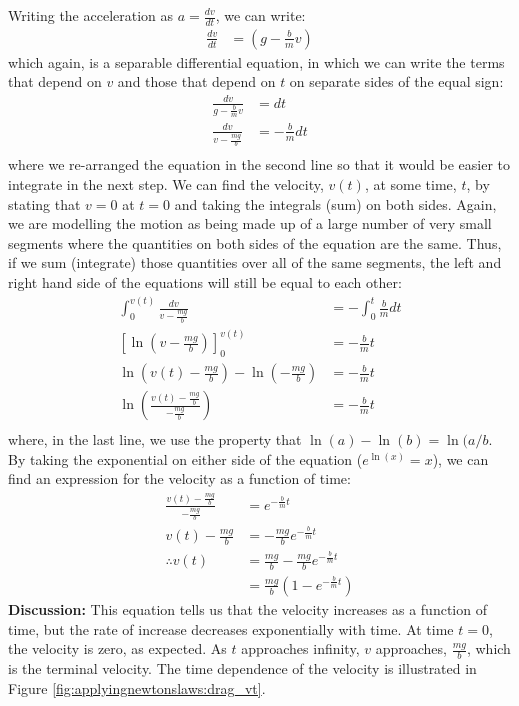 \begin{example}
Writing the acceleration as $a=\frac{dv}{dt}$, we can write:
\begin{align*}
\frac{dv}{dt} &= \left(g-\frac{b}{m}v \right)
\end{align*}
which again, is a separable differential equation, in which we can write the terms that depend on $v$ and those that depend on $t$ on separate sides of the equal sign:
\begin{align*}
\frac{dv}{g-\frac{b}{m}v}&= dt\\
\frac{dv}{v-\frac{mg}{b}}&= -\frac{b}{m}dt\\
\end{align*}
where we re-arranged the equation in the second line so that it would be easier to integrate in the next step. We can find the velocity, $v(t)$, at some time, $t$, by stating that $v=0$ at $t=0$ and taking the integrals (sum) on both sides. Again, we are modelling the motion as being made up of a large number of very small segments where the quantities on both sides of the equation are the same. Thus, if we sum (integrate) those quantities over all of the same segments, the left and right hand side of the equations will still be equal to each other:
\begin{align*}
\int_0^{v(t)}\frac{dv}{v-\frac{mg}{b}} &= -\int_0^t\frac{b}{m} dt\\
\left[\ln\left(v-\frac{mg}{b} \right)\right]_0^{v(t)} &=-\frac{b}{m}t\\
\ln\left(v(t)-\frac{mg}{b} \right)-\ln\left(-\frac{mg}{b} \right)&=-\frac{b}{m}t\\
\ln\left( \frac{v(t)-\frac{mg}{b}}{-\frac{mg}{b}} \right)&=-\frac{b}{m}t\\
\end{align*}
where, in the last line, we use the property that $\ln(a)-\ln(b)=\ln(a/b$. By taking the exponential on either side of the equation ($e^{\ln(x)}=x$), we can find an expression for the velocity as a function of time:
\begin{align*}
\frac{v(t)-\frac{mg}{b}}{-\frac{mg}{b}} &= e^{-\frac{b}{m}t}\\
v(t)-\frac{mg}{b} &= -\frac{mg}{b}e^{-\frac{b}{m}t}\\
\therefore v(t) &= \frac{mg}{b}-\frac{mg}{b}e^{-\frac{b}{m}t}\\
&=\frac{mg}{b}\left(1-e^{-\frac{b}{m}t}\right)
\end{align*}
\textbf{Discussion:} This equation tells us that the velocity increases as a function of time, but the rate of increase decreases exponentially with time. At time $t=0$, the velocity is zero, as expected. As $t$ approaches infinity, $v$ approaches, $\frac{mg}{b}$, which is the terminal velocity. The time dependence of the velocity is illustrated in Figure \ref{fig:applyingnewtonslaws:drag_vt}.


 
\end{example}

